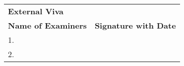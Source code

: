 \begin{titlepage}
  
  
  
  \vspace{1cm}
  \begin{table}[H]
  \centering
  \renewcommand{\arraystretch}{1.5} %
  \begin{tabular}{p{} p{}}
  \textbf{\Large External Viva} & \\
  \textbf{Name of Examiners} & \textbf{Signature with Date} \\
  1. & \\
  2. & \\
  \end{tabular}
  \end{table}
  
  \end{titlepage}
  